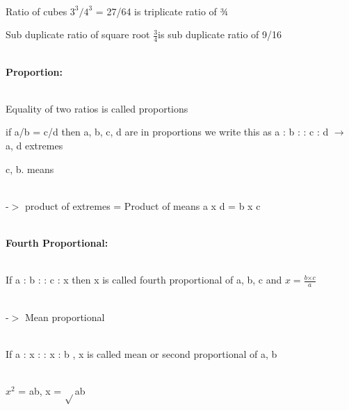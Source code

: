 \documentclass{article}
\begin{document}
\noindent 

\noindent 

\noindent \\   Ratio of cubes $ 3^{3}/4^{3} $ = 27/64 is triplicate ratio of ¾

\noindent 

\noindent 

\noindent Sub duplicate ratio of square root $ \frac{3}{4} $is sub duplicate ratio of 9/16

\noindent 

\noindent 

\noindent  \\ \textbf{Proportion:}

\noindent 

\noindent 

\noindent \\  Equality of two ratios is called proportions

\noindent 

\noindent 

\noindent if a/b = c/d then a, b, c, d are in proportions we write this as 
a : b  : : c : d $\mathrm{\to}$ a, d extremes

\noindent 

\noindent c, b. means

\noindent 

\noindent 

\noindent \\   -$\mathrm{>}$ product of extremes = Product of means a x d = b x c

\noindent \\  \textbf{Fourth Proportional:}

\noindent 

\noindent 

\noindent \\   If a : b : : c  : x then x is called fourth proportional of a, b, c and $ x = \frac{b \mathrm{\times} c}{a} $

\noindent 

\noindent \\   -$\mathrm{>}$ Mean proportional

\noindent 

\noindent 

\noindent \\   If a : x : : x : b , x is called mean or second proportional of a, b 


\noindent \\  $ x^{2} $ = ab, x = $\mathrm{\sqrt{}}$ab
\end{document}
